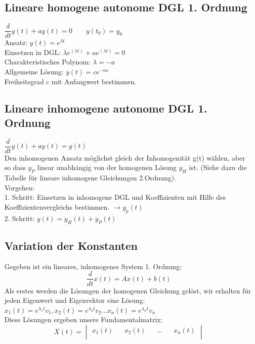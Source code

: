 \subsection{Lineare homogene autonome DGL 1. Ordnung}
$\dfrac{d}{dt}y(t)+ay(t)=0 \qquad y(t_0)=y_0$\\
Ansatz: $y(t) = e^{\lambda t}$\\
Einsetzen in DGL: $\lambda e^(\lambda t) + ae^(\lambda t) = 0$\\
Charakteristisches Polynom: $\lambda = -a$\\
Allgemeine Lösung: $y(t) = ce^{-ax}$\\
Freiheitsgrad c mit Anfangwert bestimmen. 
\subsection{Lineare inhomogene autonome DGL 1. Ordnung}
$\dfrac{d}{dt}y(t)+ay(t) = g(t)$\\
Den inhomogenen Ansatz möglichst gleich der Inhomogenität g(t) wählen, aber so dass $y_P$ linear unabhängig von der homogenen Lösung $y_H$ ist. (Siehe dazu die Tabelle für lineare inhomogene Gleichungen 2.Ordnung). \\
Vorgehen:\\
1. Schritt: Einsetzen in inhomogene DGL und Koeffizienten mit Hilfe des Koeffizientenvergleichs bestimmen. $\rightarrow y_p(t)$\\
2. Schritt: $y(t) = y_H(t)+y_P(t)$ \\
\subsection{Variation der Konstanten}
Gegeben ist ein lineares, inhomogenes System 1. Ordnung: \\
\begin{equation*}
\frac{d}{dt}x(t) = Ax(t) + b(t) 
\end{equation*}
Als erstes werden die Lösungen der homogenen Gleichung gelöst, wir erhalten für jeden Eigenwert und Eigenvektor eine Lösung: \\
$x_1(t) = e^{\lambda_1t}v_1,x_2(t) = e^{\lambda_2t}v_2...x_n(t) = e^{\lambda_nt}v_n$\\
Diese Lösungen ergeben unsere Fundamentalmatrix:\\
\begin{equation*}
X(t) = 
	\begin{vmatrix} 
	        x_1(t) && x_2(t) && ... && x_n(t)\\    
	\end{vmatrix}
\end{equation*}

